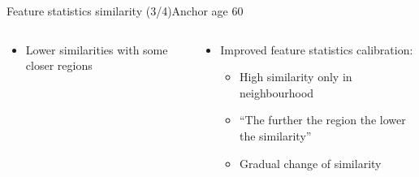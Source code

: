 \begin{frame}{Feature statistics similarity (3/4)}{Anchor age 60}
\begin{columns}
\begin{column}{0.5\textwidth}
\begin{itemize}
				\item Lower similarities with some closer regions
			\end{itemize}
		\end{column}
		\begin{column}{0.5\textwidth}
			\begin{itemize}
				\item Improved feature statistics calibration:
				\begin{itemize}
					\vspace{-1.5em}
					\scriptsize
					\item High similarity only in neighbourhood
					\item ``The further the region the lower the similarity''
					\item Gradual change of similarity
				\end{itemize}
			\end{itemize}
		\end{column}
	\end{columns}
\end{frame}

